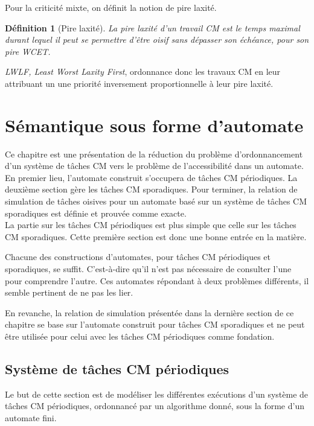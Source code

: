 \documentclass[12pt,a4paper,oneside]{book}
\theoremstyle{break}
\newtheorem{defin}{Définition}[chapter]
\theoremstyle{breakplain}
\begin{document}
Pour la criticité mixte, on définit la notion de pire laxité.\\

\begin{defin}[Pire laxité]
La pire laxité d'un travail CM est le temps maximal durant lequel il peut se permettre d'être oisif sans dépasser son échéance, pour son pire WCET.
\end{defin}

\textit{LWLF, Least Worst Laxity First}, ordonnance donc les travaux CM en leur attribuant un une priorité inversement proportionnelle à leur pire laxité.




\chapter{Sémantique sous forme d'automate}
\label{chap:automate}
Ce chapitre est une présentation de la réduction du problème d'ordonnancement d'un système de tâches CM vers le problème de l'accessibilité dans un automate.\\

En premier lieu, l'automate construit s'occupera de tâches CM périodiques. La deuxième section gère les tâches CM sporadiques. Pour terminer, la relation de simulation de tâches oisives pour un automate basé sur un système de tâches CM sporadiques est définie et prouvée comme exacte.\\

La partie sur les tâches CM périodiques est plus simple que celle sur les tâches CM sporadiques. Cette première section est donc une bonne entrée en la matière.

Chacune des constructions d'automates, pour tâches CM périodiques et sporadiques, se suffit. C'est-à-dire qu'il n'est pas nécessaire de consulter l'une pour comprendre l'autre. Ces automates répondant à deux problèmes différents, il semble pertinent de ne pas les lier.


En revanche, la relation de simulation présentée dans la dernière section de ce chapitre se base sur l'automate construit pour tâches CM sporadiques et ne peut être utilisée pour celui avec les tâches CM périodiques comme fondation.

\section{Système de tâches CM périodiques}
Le but de cette section est de modéliser les différentes exécutions d'un système de tâches CM périodiques, ordonnancé par un algorithme donné, sous la forme d'un automate fini.\\
\end{document}
